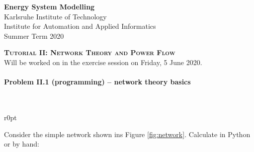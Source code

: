 \documentclass[11pt,a4paper,fleqn]{scrartcl}
\begin{document}
\begin{flushright}
 \textbf{Energy System Modelling }\\
 {\small Karlsruhe Institute of Technology}\\
 {\small Institute for Automation and Applied Informatics}\\
 {\small Summer Term 2020}\\
\end{flushright}

 
 \vspace{-0.5em}
 \hrulefill
 \vspace{0.3em}

\begin{center}
 \textbf{\textsc{\Large Tutorial II: Network Theory and Power Flow}}\\
 \small Will be worked on in the exercise session on Friday, 5 June 2020.\\[1.5em]
\end{center}

\vspace{-0.5em}
\hrulefill
\vspace{0.8em}

\paragraph{Problem II.1 (programming) -- network theory basics \faGroup}~\\

\begin{wrapfigure}[10]{r}{0pt}
 \centering
 \caption{Simple Network}
 \label{fig:network}
\end{wrapfigure}


Consider the simple network shown ins Figure \ref{fig:network}. Calculate in Python or by hand:
\end{document}
